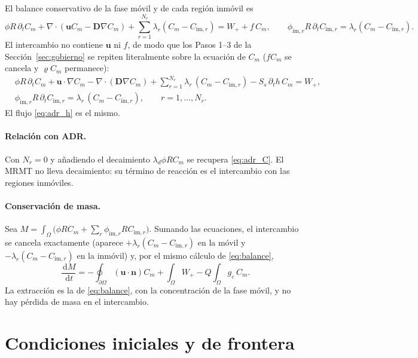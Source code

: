 \documentclass[11pt]{article}
\numberwithin{equation}{section}
\theoremstyle{remark}
\newcommand{\bu}{\mathbf{u}}
\newcommand{\bD}{\mathbf{D}}
\newcommand{\bn}{\mathbf{n}}
\newcommand{\geps}{g_\varepsilon}
\newcommand{\im}{\mathrm{im}}
\newcommand{\vr}{\varrho}              %
\newcommand{\dd}{\,\mathrm{d}}
\begin{document}
El balance conservativo de la fase m\'ovil y de cada regi\'on inm\'ovil es
\begin{equation}
\phi R\,\partial_tC_m+\nabla\!\cdot(\bu C_m-\bD\nabla C_m)+\sum_{r=1}^{N_r}\lambda_r(C_m-C_{\im,r})=W_++f\,C_m,\qquad
\phi_{\im,r}R\,\partial_tC_{\im,r}=\lambda_r(C_m-C_{\im,r}).
\end{equation}
El intercambio no contiene $\bu$ ni $f$, de modo que los Pasos 1--3 de la Secci\'on~\ref{sec:gobierno} se repiten literalmente
sobre la ecuaci\'on de $C_m$ ($fC_m$ se cancela y $\vr C_m$ permanece):
\begin{equation}
\boxed{\begin{aligned}
&\phi R\,\partial_tC_m+\bu\cdot\nabla C_m-\nabla\!\cdot(\bD\nabla C_m)+\sum_{r=1}^{N_r}\lambda_r\,(C_m-C_{\im,r})-S_s\,\partial_th\,C_m=W_+,\\
&\phi_{\im,r}R\,\partial_tC_{\im,r}=\lambda_r\,(C_m-C_{\im,r}),\qquad r=1,\dots,N_r.
\end{aligned}}
\label{eq:N_MRMT}
\end{equation}
El flujo \eqref{eq:adr_h} es el mismo.

\paragraph{Relaci\'on con ADR.} Con $N_r=0$ y a\~nadiendo el decaimiento $\lambda_d\phi RC_m$ se recupera \eqref{eq:adr_C}. El MRMT no
lleva decaimiento: su t\'ermino de reacci\'on es el intercambio con las regiones inm\'oviles.

\paragraph{Conservaci\'on de masa.} Sea $M=\int_\Omega\bigl(\phi RC_m+\sum_r\phi_{\im,r}RC_{\im,r}\bigr)$. Sumando las ecuaciones, el
intercambio se cancela exactamente (aparece $+\lambda_r(C_m-C_{\im,r})$ en la m\'ovil y $-\lambda_r(C_m-C_{\im,r})$ en la inm\'ovil) y, por el
mismo c\'alculo de \eqref{eq:balance},
\[
\frac{\dd M}{\dd t}=-\oint_{\partial\Omega}(\bu\cdot\bn)C_m+\int_\Omega W_+-Q\!\int_\Omega\geps\,C_m .
\]
La extracci\'on es la de \eqref{eq:balance}, con la concentraci\'on de la fase m\'ovil, y no hay p\'erdida de masa en el intercambio.

\section{Condiciones iniciales y de frontera}
\label{sec:bc}
\end{document}
